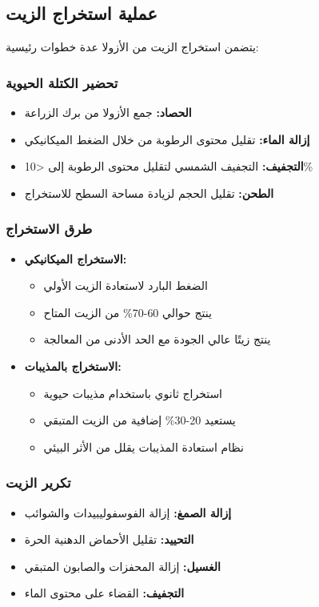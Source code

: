 \subsection{عملية استخراج الزيت}

يتضمن استخراج الزيت من الأزولا عدة خطوات رئيسية:

\subsubsection{تحضير الكتلة الحيوية}
\begin{itemize}
    \item \textbf{الحصاد:} جمع الأزولا من برك الزراعة
    \item \textbf{إزالة الماء:} تقليل محتوى الرطوبة من خلال الضغط الميكانيكي
    \item \textbf{التجفيف:} التجفيف الشمسي لتقليل محتوى الرطوبة إلى <10\%
    \item \textbf{الطحن:} تقليل الحجم لزيادة مساحة السطح للاستخراج
\end{itemize}

\subsubsection{طرق الاستخراج}
\begin{itemize}
    \item \textbf{الاستخراج الميكانيكي:}
    \begin{itemize}
        \item الضغط البارد لاستعادة الزيت الأولي
        \item ينتج حوالي 60-70\% من الزيت المتاح
        \item ينتج زيتًا عالي الجودة مع الحد الأدنى من المعالجة
    \end{itemize}
    
    \item \textbf{الاستخراج بالمذيبات:}
    \begin{itemize}
        \item استخراج ثانوي باستخدام مذيبات حيوية
        \item يستعيد 20-30\% إضافية من الزيت المتبقي
        \item نظام استعادة المذيبات يقلل من الأثر البيئي
    \end{itemize}
\end{itemize}

\subsubsection{تكرير الزيت}
\begin{itemize}
    \item \textbf{إزالة الصمغ:} إزالة الفوسفوليبيدات والشوائب
    \item \textbf{التحييد:} تقليل الأحماض الدهنية الحرة
    \item \textbf{الغسيل:} إزالة المحفزات والصابون المتبقي
    \item \textbf{التجفيف:} القضاء على محتوى الماء
\end{itemize}

